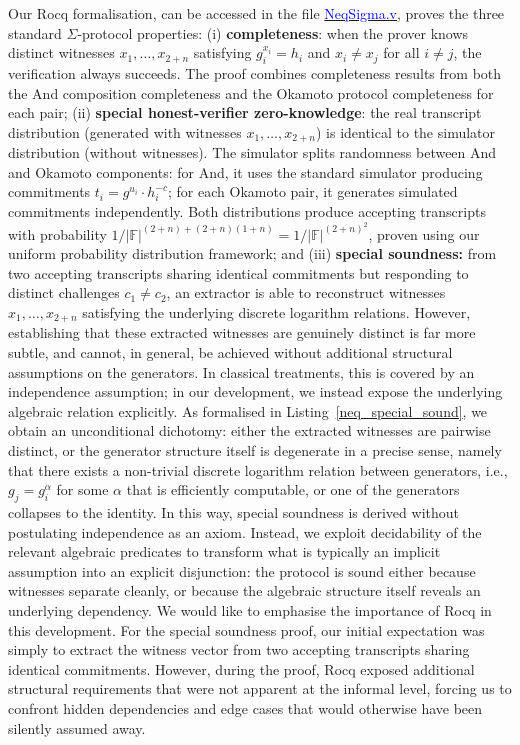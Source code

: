 \documentclass[sigconf, anonymous]{acmart}
\begin{document}
Our Rocq formalisation, can be accessed in the file \href{https://anonymous.4open.science/r/SigmaProtocol-EBA5/src/Crypto/NeqSigma.v}{\textcolor{blue}{NeqSigma.v}}, proves the three standard $\Sigma$-protocol properties: (i) \textbf{completeness}: 
when the prover knows distinct witnesses $x_1, \ldots, x_{2+n}$ satisfying $g_i^{x_i} = h_i$ and $x_i \neq x_j$ 
for all $i \neq j$, the verification always succeeds. The proof combines completeness results from both the And composition completeness and the Okamoto protocol completeness for each pair; (ii) \textbf{special honest-verifier zero-knowledge}: 
the real transcript distribution (generated with witnesses $x_1, \ldots, x_{2+n}$) is identical to the 
simulator distribution (without witnesses). The simulator splits randomness between And and Okamoto 
components: for And, it uses the standard simulator producing commitments $t_i = g^{u_i} \cdot h_i^{-c}$; 
for each Okamoto pair, it generates simulated commitments independently. Both distributions produce 
accepting transcripts with probability $1/|\mathbb{F}|^{(2+n) + (2+n)(1+n)} = 1/|\mathbb{F}|^{(2+n)^2}$, proven 
using our uniform probability distribution framework; and (iii) \textbf{special soundness:} from two accepting transcripts sharing identical commitments but responding to distinct challenges \(c_1 \neq c_2\), an extractor is able to reconstruct witnesses \(x_1, \ldots, x_{2+n}\) satisfying the underlying discrete logarithm relations.  However, establishing that these extracted witnesses are genuinely distinct is far more subtle, and cannot, in general, be achieved without additional structural assumptions on the generators. In classical treatments, this is covered by an independence assumption; in our development, we instead expose the underlying algebraic relation explicitly. As formalised in Listing~\ref{neq_special_sound}, we obtain an unconditional dichotomy: either the extracted witnesses are pairwise distinct, or the generator structure itself is degenerate in a precise sense, namely that there exists a non-trivial discrete logarithm relation between generators, i.e., \(g_j = g_i^\alpha\) for some \(\alpha\) that is efficiently computable, or one of the generators collapses to the identity.  In this way, special soundness is derived without postulating independence as an axiom. Instead, we exploit decidability of the relevant algebraic predicates to transform what is typically an implicit assumption into an explicit disjunction:
the protocol is sound either because witnesses separate cleanly, or because the algebraic structure itself reveals an underlying dependency. We would like to emphasise the importance of Rocq in this development. For the special soundness proof, our initial expectation was simply to extract the witness vector from two accepting transcripts sharing identical commitments. However, during the proof, Rocq exposed additional structural requirements that were not apparent at the informal level, forcing us to confront hidden dependencies and edge cases that would otherwise have been silently assumed away.
\end{document}
